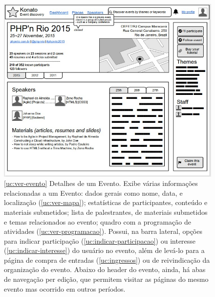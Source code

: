 \documentclass[12pt,a4paper,twoside,hyphens,english,brazil]{abntex2}
\begin{document}
{\begin{figure}[h]
\centering
	\includegraphics[width=1\linewidth]{imagens/prototipos/1-4_Event_details.jpg}
	\caption[Detalhes de um Evento]{\ref{uc:ver-evento} Detalhes de um Evento. Exibe várias informações relacionadas a um Evento: dados gerais como nome, data, e localização (\ref{uc:ver-mapa}); estatísticas de participantes, conteúdo e materiais submetidos; lista de palestrantes, de materiais submetidos e temas relacionados ao evento; quadro com a programação de atividades (\ref{uc:ver-programacao}). Possui, na barra lateral, opções para indicar participação (\ref{uc:indicar-participacao}) ou interesse (\ref{uc:indicar-interesse}) do usuário no evento, além de levá-lo para a página de compra de entradas (\ref{uc:ingressos}) ou de reivindicação da organização do evento. Abaixo do header do evento, ainda, há abas de navegação per edição, que permitem visitar as páginas do mesmo evento mas ocorrido em outros períodos.}
	\label{prot:event}
\end{figure}

}
\end{document}
